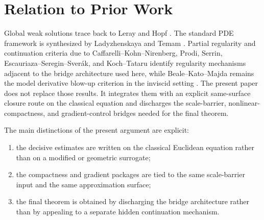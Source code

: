\section{Relation to Prior Work}

Global weak solutions trace back to Leray and Hopf \cite{Leray1934,Hopf1951}. The standard PDE framework is synthesized by Ladyzhenskaya and Temam \cite{Ladyzhenskaya1969,Temam2001}. Partial regularity and continuation criteria due to Caffarelli--Kohn--Nirenberg, Prodi, Serrin, Escauriaza--Seregin--Sver\'ak, and Koch--Tataru identify regularity mechanisms adjacent to the bridge architecture used here, while Beale--Kato--Majda remains the model derivative blow-up criterion in the inviscid setting \cite{CaffarelliKohnNirenberg1982,Prodi1959,Serrin1962,EscauriazaSereginSverak2003,KochTataru2001,BealeKatoMajda1984}. The present paper does not replace those results. It integrates them with an explicit same-surface closure route on the classical equation and discharges the scale-barrier, nonlinear-compactness, and gradient-control bridges needed for the final theorem.

The main distinctions of the present argument are explicit:
\begin{enumerate}[leftmargin=*]
\item the decisive estimates are written on the classical Euclidean equation rather than on a modified or geometric surrogate;
\item the compactness and gradient packages are tied to the same scale-barrier input and the same approximation surface;
\item the final theorem is obtained by discharging the bridge architecture rather than by appealing to a separate hidden continuation mechanism.
\end{enumerate}
